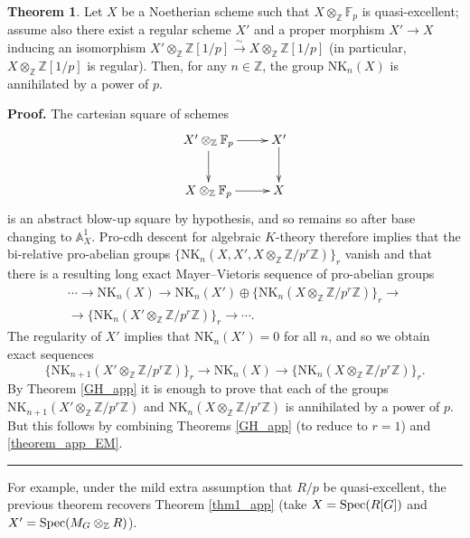 \documentclass[reqno,11pt,letterpaper]{amsart}
\theoremstyle{plain}
\numberwithin{equation}{subsection}
\newtheorem{theorem}[equation]{Theorem}
\theoremstyle{remark}
\theoremstyle{plain}
\theoremstyle{definition}\newtheorem*{notation}{Notation}
\newcommand{\bbF}{{\mathbb F}}
\newcommand{\bbZ}{{\mathbb Z}}
\newcommand{\bb}{\mathbb}
\newtheorem{theorem}{Theorem}
\newenvironment{proof}[1][Proof]{\noindent\textbf{#1.} }{\ \rule{0.5em}{0.5em}}
\newcommand{\NK}{\mathrm{NK}}
\begin{document}
\begin{theorem}\label{thm2_app}
Let $X$ be a Noetherian scheme such that $X\otimes_\bbZ\bbF_p$ is quasi-excellent; assume also there exist a regular scheme $X'$ and a proper morphism $X'\to X$ inducing an isomorphism $X'\otimes_{\bbZ}\bbZ[1/p]\xrightarrow{\sim} X\otimes_{\bbZ}\bbZ[1/p]$ (in particular, $X\otimes_\bbZ\bbZ[1/p]$ is regular). Then, for any $n\in\bbZ$, the group $\NK_n(X)$ is annihilated by a power of $p$.
\end{theorem}
\begin{proof}
The cartesian square of schemes
\[\xymatrix{
X'\otimes_{\bbZ}\bbF_p\ar[r] \ar[d] &X'\ar[d]\\
X\otimes_{\bbZ}\bbF_p\ar[r]&X
}\]
is an abstract blow-up square by hypothesis, and so remains so after base changing to $\bb A_X^1$. Pro-cdh descent for algebraic $K$-theory \cite[Thm.~A]{KerzStrunkTamme_procdh} therefore implies that the bi-relative pro-abelian groups $\{\NK_n(X,X',X\otimes_{\bbZ}\bbZ/p^r\bbZ)\}_r$ vanish and that there is a resulting long exact Mayer--Vietoris sequence of pro-abelian groups
  \begin{multline}
\cdots \to \NK_n(X)\to \NK_n(X')\oplus \{\NK_n(X\otimes_{\bbZ}\bbZ/p^r\bbZ)\}_r\to\\
\to \{\NK_n(X'\otimes_{\bbZ}\bbZ/p^r\bbZ)\}_r\to\cdots. 
  \end{multline}
 The regularity of $X'$ implies that $\NK_n(X')=0$ for all $n$, and so we obtain exact sequences \[\{\NK_{n+1}(X'\otimes_{\bbZ}\bbZ/p^r\bbZ)\}_r\to \NK_n(X)\to \{\NK_n(X\otimes_{\bbZ}\bbZ/p^r\bbZ)\}_r.\] By Theorem \ref{GH_app} it is enough to prove that each of the groups $\NK_{n+1}(X'\otimes_{\bbZ}\bbZ/p^r\bbZ)$ and $\NK_n(X\otimes_{\bbZ}\bbZ/p^r\bbZ)$ is annihilated by a power of $p$. But this follows by combining Theorems \ref{GH_app} (to reduce to $r=1$) and \ref{theorem_app_EM}.
\end{proof}

For example, under the mild extra assumption that $R/p$ be quasi-excellent, the previous theorem recovers Theorem \ref{thm1_app} (take $X={\rm Spec}(R[G])$ and $X'={\rm Spec}(M_G\otimes_\bbZ R)$).
 
 \medskip
 
 
 
\end{document}
